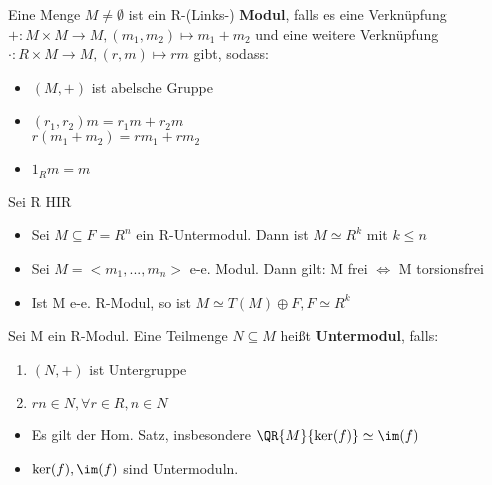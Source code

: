 \begin{definition}
Eine Menge $M \neq \emptyset$ ist ein R-(Links-) \textbf{Modul}, falls es eine Verknüpfung $+:M \times M \rightarrow M, (m_1,m_2) \mapsto m_1+m_2$ und eine weitere Verknüpfung $\cdot:R \times M \rightarrow M, (r,m) \mapsto rm$ gibt, sodass:
\begin{itemize}
	\item $(M,+)$ ist abelsche Gruppe
	\item $(r_1,r_2)m = r_1 m + r_2 m$\\$r(m_1+m_2) = rm_1+rm_2$
	\item $1_R m = m$
\end{itemize}
\end{definition}
\begin{remark}
Sei R HIR
\begin{itemize}
	\item Sei $ M \subseteq F = R^n$ ein R-Untermodul. Dann ist $M \simeq R^k$ mit $k \leq n$
	\item Sei $M=<m_1,...,m_n>$ e-e. Modul. Dann gilt: M frei $\Leftrightarrow$ M torsionsfrei
	\item Ist M e-e. R-Modul, so ist $M \simeq T(M) \oplus F, F \simeq R^k$
\end{itemize}
\end{remark}

\begin{definition}
Sei M ein R-Modul. Eine Teilmenge $N \subseteq M$ heißt \textbf{Untermodul}, falls:
\begin{enumerate}
	\item $(N,+)$ ist Untergruppe
	\item $rn \in N, \forall r \in R, n\in N$
\end{enumerate}
\end{definition}

\begin{remark}
\leavevmode
\begin{itemize}
	\item Es gilt der Hom. Satz, insbesondere $\QR{M}{\ker(f)} \simeq \im(f)$
	\item $\ker(f),\im(f)$ sind Untermoduln.
\end{itemize}
\end{remark}

